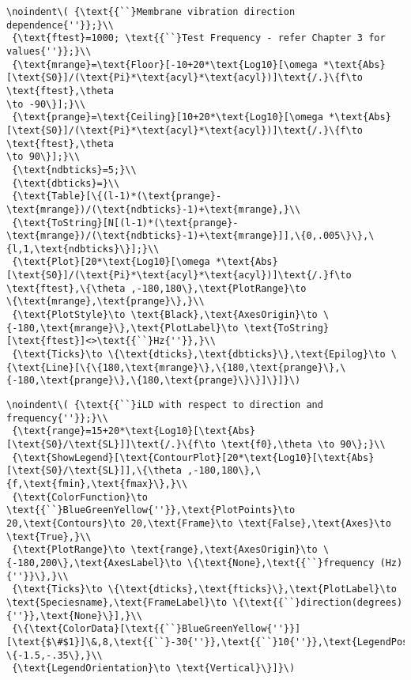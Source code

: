 \begin{appendix}
\begin{verbatim}
\noindent\( {\text{{``}Membrane vibration direction dependence{''}};}\\
 {\text{ftest}=1000; \text{{``}Test Frequency - refer Chapter 3 for values{''}};}\\
 {\text{mrange}=\text{Floor}[-10+20*\text{Log10}[\omega *\text{Abs}[\text{S0}]/(\text{Pi}*\text{acyl}*\text{acyl})]\text{/.}\{f\to \text{ftest},\theta
\to -90\}];}\\
 {\text{prange}=\text{Ceiling}[10+20*\text{Log10}[\omega *\text{Abs}[\text{S0}]/(\text{Pi}*\text{acyl}*\text{acyl})]\text{/.}\{f\to \text{ftest},\theta
\to 90\}];}\\
 {\text{ndbticks}=5;}\\
 {\text{dbticks}=}\\
 {\text{Table}[\{(l-1)*(\text{prange}-\text{mrange})/(\text{ndbticks}-1)+\text{mrange},}\\
 {\text{ToString}[N[(l-1)*(\text{prange}-\text{mrange})/(\text{ndbticks}-1)+\text{mrange}]],\{0,.005\}\},\{l,1,\text{ndbticks}\}];}\\
 {\text{Plot}[20*\text{Log10}[\omega *\text{Abs}[\text{S0}]/(\text{Pi}*\text{acyl}*\text{acyl})]\text{/.}f\to \text{ftest},\{\theta ,-180,180\},\text{PlotRange}\to
\{\text{mrange},\text{prange}\},}\\
 {\text{PlotStyle}\to \text{Black},\text{AxesOrigin}\to \{-180,\text{mrange}\},\text{PlotLabel}\to \text{ToString}[\text{ftest}]<>\text{{``}Hz{''}},}\\
 {\text{Ticks}\to \{\text{dticks},\text{dbticks}\},\text{Epilog}\to \{\text{Line}[\{\{180,\text{mrange}\},\{180,\text{prange}\},\{-180,\text{prange}\},\{180,\text{prange}\}\}]\}]}\)
\end{verbatim}

\begin{verbatim}
\noindent\( {\text{{``}iLD with respect to direction and frequency{''}};}\\
 {\text{range}=15+20*\text{Log10}[\text{Abs}[\text{S0}/\text{SL}]]\text{/.}\{f\to \text{f0},\theta \to 90\};}\\
 {\text{ShowLegend}[\text{ContourPlot}[20*\text{Log10}[\text{Abs}[\text{S0}/\text{SL}]],\{\theta ,-180,180\},\{f,\text{fmin},\text{fmax}\},}\\
 {\text{ColorFunction}\to \text{{``}BlueGreenYellow{''}},\text{PlotPoints}\to 20,\text{Contours}\to 20,\text{Frame}\to \text{False},\text{Axes}\to
\text{True},}\\
 {\text{PlotRange}\to \text{range},\text{AxesOrigin}\to \{-180,200\},\text{AxesLabel}\to \{\text{None},\text{{``}frequency (Hz){''}}\},}\\
 {\text{Ticks}\to \{\text{dticks},\text{fticks}\},\text{PlotLabel}\to \text{Speciesname},\text{FrameLabel}\to \{\text{{``}direction(degrees){''}},\text{None}\}],}\\
 {\{\text{ColorData}[\text{{``}BlueGreenYellow{''}}][\text{$\#$1}]\&,8,\text{{``}-30{''}},\text{{``}10{''}},\text{LegendPosition}\to \{-1.5,-.35\},}\\
 {\text{LegendOrientation}\to \text{Vertical}\}]}\)
\end{verbatim}


\end{appendix}
